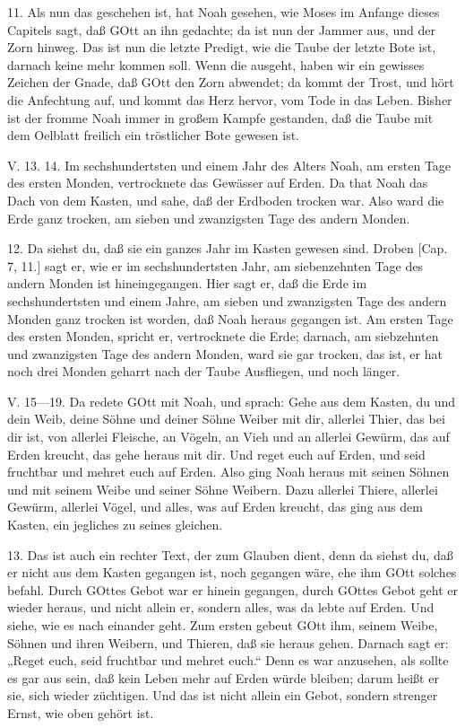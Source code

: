 11. Als nun das geschehen ist, hat Noah gesehen, wie Moses im Anfange dieses Capitels sagt, daß GOtt an ihn gedachte; da ist nun der Jammer aus, und der Zorn hinweg. Das ist nun die letzte Predigt, wie die Taube der letzte Bote ist, darnach keine mehr kommen soll. Wenn die ausgeht, haben wir ein gewisses Zeichen der Gnade, daß GOtt den Zorn abwendet; da kommt der Trost, und hört die Anfechtung auf, und kommt das Herz hervor, vom Tode in das Leben. Bisher ist der fromme Noah immer in großem Kampfe gestanden, daß die Taube mit dem Oelblatt freilich ein tröstlicher Bote gewesen ist.

\begin{schriftzitat}
V. 13. 14. Im sechshundertsten und einem Jahr des Alters Noah, am ersten Tage des ersten Monden, vertrocknete das Gewässer auf Erden. Da that Noah das Dach von dem Kasten, und sahe, daß der Erdboden trocken war. Also ward die Erde ganz trocken, am sieben und zwanzigsten Tage des andern Monden.
\end{schriftzitat}

12. Da siehst du, daß sie ein ganzes Jahr im Kasten gewesen sind. Droben [Cap. 7, 11.] sagt er, wie er im sechshundertsten Jahr, am siebenzehnten Tage des andern Monden ist hineingegangen. Hier sagt er, daß die Erde im sechshundertsten und einem Jahre, am sieben und zwanzigsten Tage des andern Monden ganz trocken ist worden, daß Noah heraus gegangen ist. Am ersten Tage des ersten Monden, spricht er, vertrocknete die Erde; darnach, am siebzehnten und zwanzigsten Tage des andern Monden, ward sie gar trocken, das ist, er hat noch drei Monden geharrt nach der Taube Ausfliegen, und noch länger.

\begin{schriftzitat}
V. 15—19. Da redete GOtt mit Noah, und sprach: Gehe aus dem Kasten, du und dein Weib, deine Söhne und deiner Söhne Weiber mit dir, allerlei Thier, das bei dir ist, von allerlei Fleische, an Vögeln, an Vieh und an allerlei Gewürm,
das auf Erden kreucht, das gehe heraus mit dir. Und reget euch auf Erden, und seid fruchtbar und mehret euch auf Erden. Also ging Noah heraus mit seinen Söhnen und mit seinem Weibe und seiner Söhne Weibern. Dazu allerlei Thiere, allerlei Gewürm, allerlei Vögel, und alles, was auf Erden kreucht, das ging aus dem Kasten, ein jegliches zu seines gleichen.
\end{schriftzitat}

13. Das ist auch ein rechter Text, der zum Glauben dient, denn da siehst du, daß er nicht aus dem Kasten gegangen ist, noch gegangen wäre, ehe ihm GOtt solches befahl. Durch GOttes Gebot war er hinein gegangen, durch GOttes Gebot geht er wieder heraus, und nicht allein er, sondern alles, was da lebte auf Erden. Und siehe, wie es nach einander geht. Zum ersten gebeut GOtt ihm, seinem Weibe, Söhnen und ihren Weibern, und Thieren, daß sie heraus gehen. Darnach sagt er: „Reget euch, seid fruchtbar und mehret euch.“ Denn es war anzusehen, als sollte es gar aus sein, daß kein Leben mehr auf Erden würde bleiben; darum heißt er sie, sich wieder züchtigen. Und das ist nicht allein ein Gebot, sondern strenger Ernst, wie oben gehört ist.

